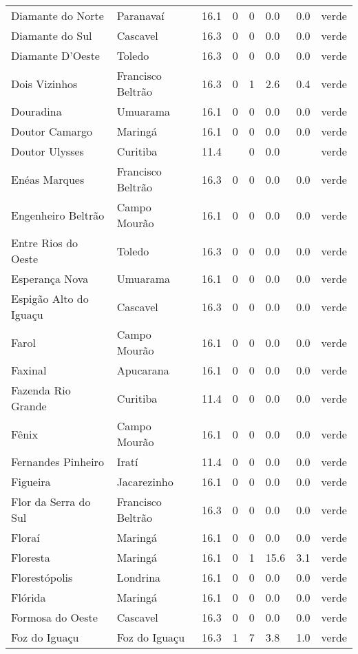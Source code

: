 \begin{longtable}{l|lllllll}
  Diamante do Norte & Paranavaí & 16.1 & 0 & 0 & 0.0 & 0.0 & verde \\ 
  Diamante do Sul & Cascavel & 16.3 & 0 & 0 & 0.0 & 0.0 & verde \\ 
  Diamante D'Oeste & Toledo & 16.3 & 0 & 0 & 0.0 & 0.0 & verde \\ 
  Dois Vizinhos & Francisco Beltrão & 16.3 & 0 & 1 & 2.6 & 0.4 & verde \\ 
  Douradina & Umuarama & 16.1 & 0 & 0 & 0.0 & 0.0 & verde \\ 
  Doutor Camargo & Maringá & 16.1 & 0 & 0 & 0.0 & 0.0 & verde \\ 
  Doutor Ulysses & Curitiba & 11.4 &  & 0 & 0.0 &  & verde \\ 
  Enéas Marques & Francisco Beltrão & 16.3 & 0 & 0 & 0.0 & 0.0 & verde \\ 
  Engenheiro Beltrão & Campo Mourão & 16.1 & 0 & 0 & 0.0 & 0.0 & verde \\ 
  Entre Rios do Oeste & Toledo & 16.3 & 0 & 0 & 0.0 & 0.0 & verde \\ 
  Esperança Nova & Umuarama & 16.1 & 0 & 0 & 0.0 & 0.0 & verde \\ 
  Espigão Alto do Iguaçu & Cascavel & 16.3 & 0 & 0 & 0.0 & 0.0 & verde \\ 
  Farol & Campo Mourão & 16.1 & 0 & 0 & 0.0 & 0.0 & verde \\ 
  Faxinal & Apucarana & 16.1 & 0 & 0 & 0.0 & 0.0 & verde \\ 
  Fazenda Rio Grande & Curitiba & 11.4 & 0 & 0 & 0.0 & 0.0 & verde \\ 
  Fênix & Campo Mourão & 16.1 & 0 & 0 & 0.0 & 0.0 & verde \\ 
  Fernandes Pinheiro & Iratí & 11.4 & 0 & 0 & 0.0 & 0.0 & verde \\ 
  Figueira & Jacarezinho & 16.1 & 0 & 0 & 0.0 & 0.0 & verde \\ 
  Flor da Serra do Sul & Francisco Beltrão & 16.3 & 0 & 0 & 0.0 & 0.0 & verde \\ 
  Floraí & Maringá & 16.1 & 0 & 0 & 0.0 & 0.0 & verde \\ 
  Floresta & Maringá & 16.1 & 0 & 1 & 15.6 & 3.1 & verde \\ 
  Florestópolis & Londrina & 16.1 & 0 & 0 & 0.0 & 0.0 & verde \\ 
  Flórida & Maringá & 16.1 & 0 & 0 & 0.0 & 0.0 & verde \\ 
  Formosa do Oeste & Cascavel & 16.3 & 0 & 0 & 0.0 & 0.0 & verde \\ 
  Foz do Iguaçu & Foz do Iguaçu & 16.3 & 1 & 7 & 3.8 & 1.0 & verde \\ 

\end{longtable}
